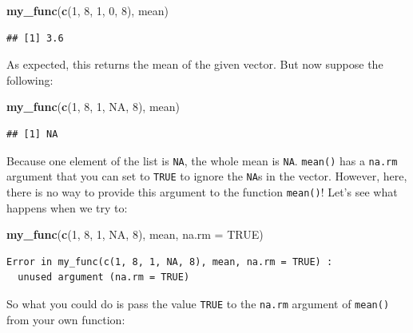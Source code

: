 \documentclass[]{gitbook}
\newenvironment{Shaded}{\begin{snugshade}}{\end{snugshade}}
\newcommand{\DataTypeTok}[1]{\textcolor[rgb]{0.13,0.29,0.53}{#1}}
\newcommand{\DecValTok}[1]{\textcolor[rgb]{0.00,0.00,0.81}{#1}}
\newcommand{\KeywordTok}[1]{\textcolor[rgb]{0.13,0.29,0.53}{\textbf{#1}}}
\newcommand{\NormalTok}[1]{#1}
\newcommand{\OtherTok}[1]{\textcolor[rgb]{0.56,0.35,0.01}{#1}}
\theoremstyle{definition}
\theoremstyle{definition}
\theoremstyle{definition}
\theoremstyle{remark}
\begin{document}
\begin{Shaded}
\begin{Highlighting}[]
\KeywordTok{my_func}\NormalTok{(}\KeywordTok{c}\NormalTok{(}\DecValTok{1}\NormalTok{, }\DecValTok{8}\NormalTok{, }\DecValTok{1}\NormalTok{, }\DecValTok{0}\NormalTok{, }\DecValTok{8}\NormalTok{), mean)}
\end{Highlighting}
\end{Shaded}

\begin{verbatim}
## [1] 3.6
\end{verbatim}

As expected, this returns the mean of the given vector. But now suppose
the following:

\begin{Shaded}
\begin{Highlighting}[]
\KeywordTok{my_func}\NormalTok{(}\KeywordTok{c}\NormalTok{(}\DecValTok{1}\NormalTok{, }\DecValTok{8}\NormalTok{, }\DecValTok{1}\NormalTok{, }\OtherTok{NA}\NormalTok{, }\DecValTok{8}\NormalTok{), mean)}
\end{Highlighting}
\end{Shaded}

\begin{verbatim}
## [1] NA
\end{verbatim}

Because one element of the list is \texttt{NA}, the whole mean is
\texttt{NA}. \texttt{mean()} has a \texttt{na.rm} argument that you can
set to \texttt{TRUE} to ignore the \texttt{NA}s in the vector. However,
here, there is no way to provide this argument to the function
\texttt{mean()}! Let's see what happens when we try to:

\begin{Shaded}
\begin{Highlighting}[]
\KeywordTok{my_func}\NormalTok{(}\KeywordTok{c}\NormalTok{(}\DecValTok{1}\NormalTok{, }\DecValTok{8}\NormalTok{, }\DecValTok{1}\NormalTok{, }\OtherTok{NA}\NormalTok{, }\DecValTok{8}\NormalTok{), mean, }\DataTypeTok{na.rm =} \OtherTok{TRUE}\NormalTok{)}
\end{Highlighting}
\end{Shaded}

\begin{verbatim}
Error in my_func(c(1, 8, 1, NA, 8), mean, na.rm = TRUE) :
  unused argument (na.rm = TRUE)
\end{verbatim}

So what you could do is pass the value \texttt{TRUE} to the
\texttt{na.rm} argument of \texttt{mean()} from your own function:
\end{document}
